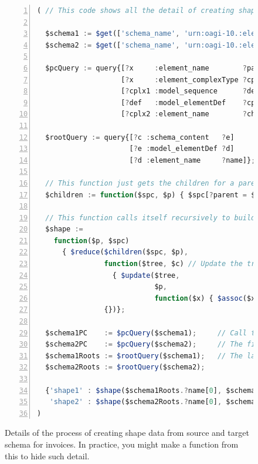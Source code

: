 \documentclass[10pt,letterpaper]{article} %
\begin{document}
\begin{figure}[H]
  \caption{Details of the process of creating shape data from source and target schema for invoices.
    In practice, you might make a function from this to hide such detail.}
  \label{fig:def-of-shape-fn}
\begin{lstlisting}[language=JavaScript,numberstyle=\scriptsize,basicstyle=\ttfamily\scriptsize,numbers=left,stepnumber=1,breaklines=true]
( // This code shows all the detail of creating shapes for $llmMatch.

  $schema1 := $get(['schema_name', 'urn:oagi-10.:elena.2023-07-02.ProcessInvoice-BC_1_v2'], ['schema_content']);
  $schema2 := $get(['schema_name', 'urn:oagi-10.:elena.2023-07-02.ProcessInvoice-BC_2_v2'], ['schema_content']);

  $pcQuery := query{[?x     :element_name        ?parent] // pc = 'parent/child'
                    [?x     :element_complexType ?cplx1]
                    [?cplx1 :model_sequence      ?def]
                    [?def   :model_elementDef    ?cplx2]
                    [?cplx2 :element_name        ?child]};

  $rootQuery := query{[?c :schema_content   ?e]
                      [?e :model_elementDef ?d]
                      [?d :element_name     ?name]};

  // This function just gets the children for a parent.
  $children := function($spc, $p) { $spc[?parent = $p].?child };

  // This function calls itself recursively to build the schema shape, starting from the root.
  $shape :=
    function($p, $spc)
      { $reduce($children($spc, $p),
                function($tree, $c) // Update the tree.
                  { $update($tree,
                            $p,
                            function($x) { $assoc($x, $c, $lookup($shape($c, $spc), $c) or '<data>')}) },
                {})};

  $schema1PC    := $pcQuery($schema1);     // Call the two queries with the two schema.
  $schema2PC    := $pcQuery($schema2);     // The first two return a binding set for {?parent x ?child y}
  $schema1Roots := $rootQuery($schema1);   // The last two return a binding set for {?name} (of a root).
  $schema2Roots := $rootQuery($schema2);

  {'shape1' : $shape($schema1Roots.?name[0], $schema1PC),
   'shape2' : $shape($schema2Roots.?name[0], $schema2PC)}
)
\end{lstlisting}
\end{figure} \vspace{-3em}
\end{document}
